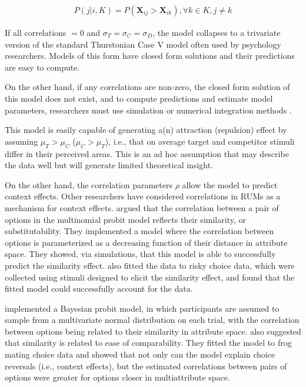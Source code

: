 \begin{align}
   P(j|i,K)=P(\mathbf{X}_{ij}>\mathbf{X}_{ik}), \forall k \in K, j \neq k
   \label{eqn:pchoice}
\end{align}

If all correlations $=0$ and $\sigma_{T}=\sigma_{C}=\sigma_{D}$, the model collapses to a trivariate version of the standard Thurstonian Case V model \parencite{thurstone1927law} often used by psychology researchers. Models of this form have closed form solutions and their predictions are easy to compute.

On the other hand, if any correlations are non-zero, the closed form solution of this model does not exist, and to compute predictions and estimate model parameters, researchers must use simulation or numerical integration methods \parencite{train2009discrete}. 

This model is easily capable of generating a(n) attraction (repulsion) effect by assuming $\mu_{T}>\mu_{C}$ ($\mu_{C}>\mu_{T}$), i.e., that on average target and competitor stimuli differ in their perceived areas. This is an ad hoc assumption that may describe the data well but will generate limited theoretical insight. 

On the other hand, the correlation parameters $\rho$ allow the model to predict context effects. Other researchers have considered correlations in RUMs as a mechanism for context effects. \textcite{kamakura1984predicting} argued that the correlation between a pair of options in the multinomial probit model reflects their similarity, or substitutability. They implemented a model where the correlation between options is parameterized as a decreasing function of their distance in attribute space. They showed, via simulations, that this model is able to successfully predict the similarity effect. \textcite{kamakura1984predicting} also fitted the data to risky choice data, which were collected using stimuli designed to elicit the similarity effect, and found that the fitted model could successfully account for the data. 

\textcite{natenzon2019random} implemented a Bayesian probit model, in which participants are assumed to sample from a multivariate normal distribution on each trial, with the correlation between options being related to their similarity in attribute space. \textcite{natenzon2019random} also suggested that similarity is related to ease of comparability. They fitted the model to frog mating choice data and showed that not only can the model explain choice reversals (i.e., context effects), but the estimated correlations between pairs of options were greater for options closer in multiattribute space. 

